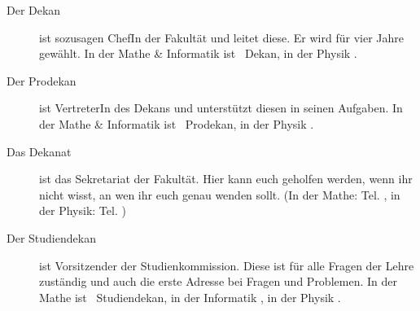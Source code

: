 \begin{description}

\item[Der Dekan] ist sozusagen ChefIn der Fakultät und leitet diese. Er wird
	für vier Jahre gewählt. In der Mathe \& Informatik ist \dekanmathelang\
	Dekan, in der Physik \dekanphysiklang .

\item[Der Prodekan] ist VertreterIn des Dekans und unterstützt diesen in seinen
	Aufgaben. In der Mathe \& Informatik ist \prodekanmathe\ Prodekan, in der
	Physik \prodekanphysik .

\item[Das Dekanat] ist das Sekretariat der Fakultät. Hier kann euch geholfen
	werden, wenn ihr nicht wisst, an wen ihr euch genau wenden sollt. (In der
	Mathe: Tel.  \dekanatmathetelefon , in der Physik: Tel.
	\dekanatphysiktelefon )

\item[Der Studiendekan] ist Vorsitzender der Studienkommission. Diese ist für
	alle Fragen der Lehre zuständig und auch die erste Adresse bei Fragen und
	Problemen. In der Mathe ist \studiendekanmathe\ Studiendekan, in der
	Informatik \studiendekaninformatik , in der Physik \studiendekanphysik .


\end{description}
